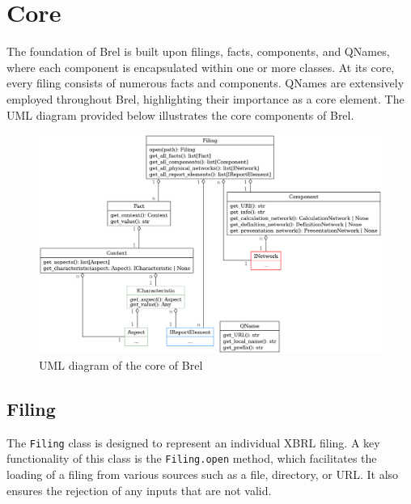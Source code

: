 \section{Core}

The foundation of Brel is built upon filings, facts, components, and QNames, where each component is encapsulated within one or more classes.
At its core, every filing consists of numerous facts and components.
QNames are extensively employed throughout Brel, highlighting their importance as a core element.
The UML diagram provided below illustrates the core components of Brel.

\begin{figure}[H]
    \centering
    \includegraphics[width=\textwidth]{images/brel_core_classes.png}
    \caption{UML diagram of the core of Brel}
    \label{fig:brel_core_classes}
\end{figure}

\subsection{Filing}
\label{subsec:filing}

The \texttt{Filing} class is designed to represent an individual XBRL filing.
A key functionality of this class is the \texttt{Filing.open} method, which facilitates the loading of a filing from various sources such as a file, directory, or URL.
It also ensures the rejection of any inputs that are not valid.

